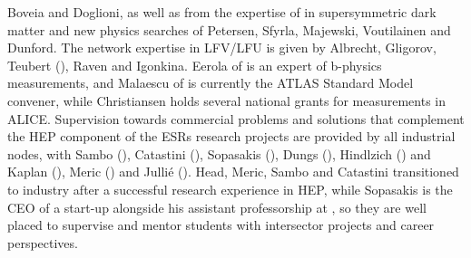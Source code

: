 Boveia and Doglioni, as well as from the expertise of in supersymmetric dark matter and new physics searches of Petersen, Sfyrla, 
Majewski, Voutilainen and Dunford. The network expertise in LFV/LFU is given by Albrecht, Gligorov, Teubert (\cernentity), Raven and Igonkina. 
Eerola of \helsinkientity is an expert of b-physics measurements,
and Malaescu of \cnrsentity is currently the ATLAS Standard Model convener, while Christiansen holds
several national grants for measurements in ALICE. 
%
Supervision towards commercial problems and solutions that complement the HEP component of the ESRs research projects 
are provided by all industrial nodes, with Sambo (\fleetmaticsentity), Catastini (\lightboxentity), Sopasakis (\ximantisentity), Dungs (\pointeightentity),
Hindlzich (\cathientity) and Kaplan (\heidelberginstrumentsentity), Meric (\dqentity) and Julli\'{e} (\ibmentity). Head, Meric, Sambo and Catastini transitioned to
industry after a successful research experience in HEP, while Sopasakis is the CEO of a start-up alongside his
assistant professorship at \lundentity, so they are well placed to supervise and mentor students with intersector projects and career perspectives. 
%





